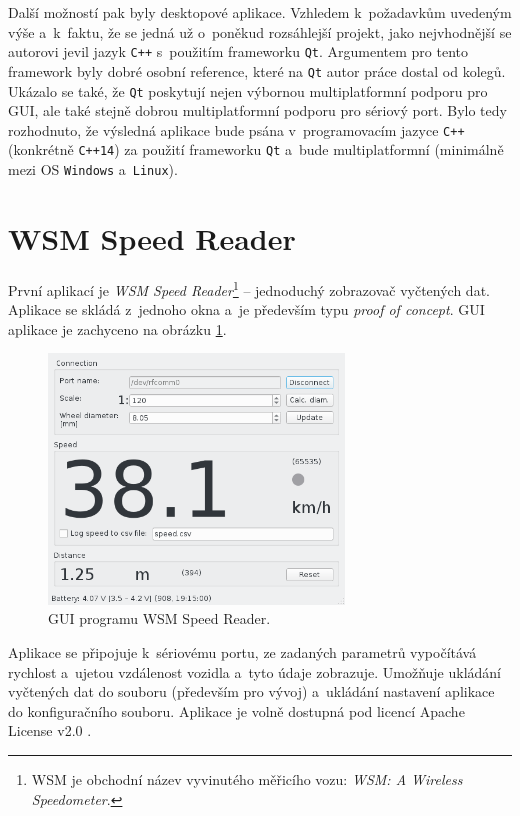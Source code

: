 Další možností pak byly desktopové aplikace. Vzhledem k~požadavkům uvedeným
výše a~k~faktu, že se jedná už o~poněkud rozsáhlejší projekt, jako nejvhodnější
se autorovi jevil jazyk \texttt{C++} s~použitím frameworku \texttt{Qt}.
Argumentem pro tento framework byly dobré osobní reference, které na
\texttt{Qt} autor práce dostal od kolegů. Ukázalo se také, že \texttt{Qt} poskytují
nejen výbornou multiplatformní podporu pro GUI, ale také stejně dobrou
multiplatformní podporu pro sériový port. Bylo tedy rozhodnuto, že výsledná
aplikace bude psána v~programovacím jazyce \texttt{C++} (konkrétně
\texttt{C++14}) za použití frameworku \texttt{Qt} a~bude multiplatformní
(minimálně mezi OS \texttt{Windows} a~\texttt{Linux}).

\section{WSM Speed Reader}
\label{sec:sw-wsm-speed-reader}

První aplikací je \textit{WSM Speed Reader}\footnote{WSM je obchodní název
vyvinutého měřicího vozu: \textit{WSM: A Wireless Speedometer}.} -- jednoduchý
zobrazovač vyčtených dat. Aplikace se skládá z~jednoho okna a~je především typu
\textit{proof of concept}. GUI aplikace je zachyceno na obrázku
\ref{fig:wsm-speed-reader-gui}.

\begin{figure}[h]
\includegraphics[width=0.7\textwidth]{data/speed_reader_screenshot.png}
\caption{GUI programu WSM Speed Reader.}
\label{fig:wsm-speed-reader-gui}
\end{figure}

Aplikace se připojuje k~sériovému portu, ze zadaných parametrů vypočítává
rychlost a~ujetou vzdálenost vozidla a~tyto údaje zobrazuje. Umožňuje ukládání
vyčtených dat do souboru (především pro vývoj) a~ukládání nastavení aplikace
do konfiguračního souboru. Aplikace je volně dostupná pod licencí Apache
License v2.0 \cite{wsm-speed-reader}.

